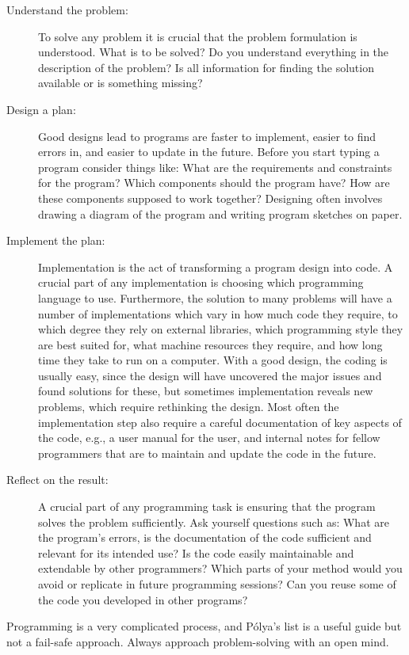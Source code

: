 \documentclass[springer.tex]{subfiles}
\begin{document}
\begin{description}
\item[Understand the problem:] To solve any problem it is crucial that the problem formulation is understood. What is to be solved? Do you understand everything in the description of the problem? Is all information for finding the solution available or is something missing?
\item[Design a plan:] Good designs lead to programs are faster to implement, easier to find errors in, and easier to update in the future. Before you start typing a program consider things like: What are the requirements and constraints for the program? Which components should the program have? How are these components supposed to work together? Designing often involves drawing a diagram of the program and writing program sketches on paper.
\item[Implement the plan:] Implementation is the act of transforming a program design into code. A crucial part of any implementation is choosing which programming language to use. Furthermore, the solution to many problems will have a number of implementations which vary in how much code they require, to which degree they rely on external libraries, which programming style they are best suited for, what machine resources they require, and how long time they take to run on a computer.  With a good design, the coding is usually easy, since the design will have uncovered the major issues and found solutions for these, but sometimes implementation reveals new problems, which require rethinking the design. Most often the implementation step also require a careful documentation of key aspects of the code, e.g., a user manual for the user, and internal notes for fellow programmers that are to maintain and update the code in the future.
\item[Reflect on the result:] A crucial part of any programming task is ensuring that the program solves the problem sufficiently. Ask yourself questions such as: What are the program's errors, is the documentation of the code sufficient and relevant for its intended use? Is the code easily maintainable and extendable by other programmers? Which parts of your method would you avoid or replicate in future programming sessions? Can you reuse some of the code you developed in other programs?
\end{description}
Programming is a very complicated process, and Pólya's list is a useful guide but not a fail-safe approach. Always approach problem-solving with an open mind.
\end{document}
